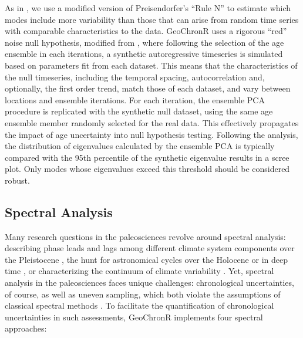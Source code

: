 \documentclass[gchron, manuscript]{copernicus}
\begin{document}
As in \citet{anchukaitis2013mceof}, we use a modified version of Preisendorfer's ``Rule N'' \citep{PreisendorferMobley1988} to estimate which modes include more variability than those that can arise from random time series with comparable characteristics to the data.
GeoChronR uses a rigorous ``red'' noise null hypothesis, modified from \citet{SchneiderNeumaier2001}, where following the selection of the age ensemble in each iterations, a synthetic autoregressive timeseries is simulated based on parameters fit from each dataset.
This means that the characteristics of the null timeseries, including the temporal spacing, autocorrelation and, optionally, the first order trend, match those of each dataset, and vary between locations and ensemble iterations.
For each iteration, the ensemble PCA procedure is replicated with the synthetic null dataset, using the same age ensemble member randomly selected for the real data.
This effectively propagates the impact of age uncertainty into null hypothesis testing.
Following the analysis, the distribution of eigenvalues calculated by the ensemble PCA is typically compared with the 95th percentile of the synthetic eigenvalue results in a scree plot.
Only modes whose eigenvalues exceed this threshold should be considered robust.

\hypertarget{sec:spec_theory}{%
\subsection{Spectral Analysis}\label{sec:spec_theory}}

Many research questions in the paleosciences revolve around spectral analysis: describing phase leads and lags among different climate system components over the Pleistocene \citep[SPECMAP,][\citet{khider2017}]{imbrie1984orbital}, the hunt for astronomical cycles over the Holocene \citep{bond2001} or in deep time \citep{MeyersSageman_2007, Meyers_2012, Meyers_2015, lisiecki2010}, or characterizing the continuum of climate variability \citep{Huybers_Curry2006, ZhuPNAS2019}.
Yet, spectral analysis in the paleosciences faces unique challenges: chronological uncertainties, of course, as well as uneven sampling, which both violate the assumptions of classical spectral methods \citep{Ghil02}.
To facilitate the quantification of chronological uncertainties in such assessments, GeoChronR implements four spectral approaches:
\end{document}
